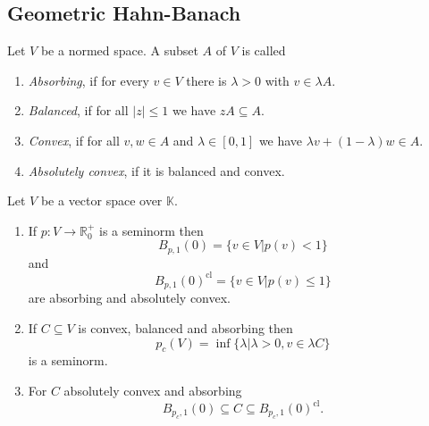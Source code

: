 \documentclass[twoside,symmetric, openany, 12pt]{./tuftebook}
\theoremstyle{definition}
\theoremstyle{definition}
\theoremstyle{definition}
\newenvironment{parts}{\begin{enumerate}[label=(\alph*)]}{\end{enumerate}}
\newcommand{\R}{\mathbb{R}}
\begin{document}
\subsection{Geometric Hahn-Banach}
\begin{Definition}
	Let $V$ be a normed space. A subset $A$ of $V$ is called
	\begin{parts}
	\item \emph{Absorbing}, if for every $v\in V$ there is $\lambda>0$ with $v\in \lambda A$.
	\item \emph{Balanced}, if for all $|z|\le 1$ we have $zA\subseteq A$.
	\item \emph{Convex}, if for all $v,w\in A$ and $\lambda\in [0,1]$ we have $\lambda v+(1-\lambda)w\in A$.
	\item \emph{Absolutely convex}, if it is balanced and convex.
	\end{parts}
\end{Definition}
\begin{Theorem}\label{thm:weakseminorms}
	Let $V$ be a vector space over $\mathbb{K}$.
	\begin{parts}
	\item If $p:V \to \R_0^+$ is a seminorm then
		\[
			B_{p,1}(0)=\{v\in V|p(v)<1\} 
		\]
		and
		\[
			B_{p,1}(0)^\text{cl}=\{v\in V|p(v)\le 1\} 
		\]
		are absorbing and absolutely convex.
	\item If $C\subseteq V$ is convex, balanced and absorbing then
		\[
		p_c(V)=\inf \{\lambda| \lambda> 0,v\in \lambda C\} 
	\]
	is a seminorm.
\item For $C$ absolutely convex and absorbing
	\[
		B_{p_c, 1}(0)\subseteq C \subseteq B_{p_c, 1}(0)^\text{cl}
	.\] 
	\end{parts}
\end{Theorem}
\end{document}
